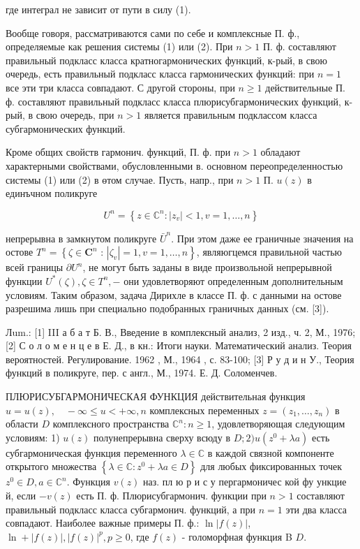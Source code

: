\documentclass[10pt]{article}
\begin{document}
где интеграл не зависит от пути в силу (1).



Вообще говоря, рассматриваются сами по себе и комплексные П. ф., определяемые как решения системы (1) или (2). При $n>1$ П. ф. составляют правильный подкласс класса кратногармонических функций, к-рый, в свою очередь, есть правильный подкласс класса гармонических функций: при $n=1$ все эти три класса совпадают. С другой стороны, при $n \geqslant 1$ действительные П. ф. составляют правильный подкласс класса плюрисубгармонических функций, к-рый, в свою очередь, при $n>1$ является правильным подклассом класса субгармонических функций.



Кроме общих свойств гармонич. функций, П. ф. при $n>1$ обладают характерными свойствами, обусловленными в. основном переопределенностью системы (1) или (2) в өтом случае. Пусть, напр., при $n>1$ П. $u(z)$ в единъчном поликруге



\[

U^{n}=\left\{z \in \mathbb{C}^{n}:\left|z_{v}\right|<1, v=1, \ldots, n\right\}

\]



непрерывна в замкнутом поликруге $\bar{U}^{n}$. При этом даже ее граничные значения на остове $T^{n}=\left\{\zeta \in \mathbf{C}^{n}\right.$ : $\left.\left|\zeta_{v}\right|=1, v=1, \ldots, n\right\}$, являюгцемся правильной частью всей границы $\partial U^{n}$, не могут быть заданы в виде произвольной непрерывной функции $U^{*}(\zeta), \zeta \in T^{n},-$ они удовлетворяют определенным дополнительным условиям. Таким образом, задача Дирихле в классе П. ф. с данными на остове разрешима лишь при специально подобранных граничных данных (см. [3]).



Лum.: [1] III а б а т Б. В., Введение в комплексный анализ, 2 изд., ч. 2, М., 1976; [2] С о л о м е н ц е в Е. Д., в кн.: Итоги науки. Математический анализ. Теория вероятностей. Регулирование. 1962 , М., 1964 , с. 83-100; [3] Р у д и н У., Теория функций в поликруге, пер. с англ., М., 1974. Е. Д. Соломенчев.



ПЛЮРИСУБГАРМОНИЧЕСКАЯ ФУНКЦИЯ действительная функция $u=u(z), \quad-\infty \leqslant u<+\infty, n$ комплексных переменных $z=\left(z_{1}, \ldots, z_{n}\right)$ в области $D$ комплексного пространства $\mathbb{C}^{n}: n \geqslant 1$, удовлетворяющая следующим условиям: 1) $u(z)$ полунепрерывна сверху всюду в $D ; 2) u\left(z^{0}+\lambda a\right)$ есть субгармоническая функция переменного $\lambda \in \mathbb{C}$ в каждой связной компоненте открытого множества $\left\{\lambda \in \mathbb{C}: z^{0}+\lambda a \in D\right\}$ для любых фиксированных точек $z^{0} \in D, a \in \mathbb{C}^{n}$. Функция $v(z)$ наз. пл ю р и с у пергармоничес кой фу ункцие й, если $-v(z)$ есть П. ф. Плюрисубгармонич. функции при $n>1$ составляют правильный подкласс класса субгармонич. функций, а при $n=1$ эти два класса совпадают. Наиболее важные примеры П. ф.: $\ln |f(z)|$, $\ln +|f(z)|,|f(z)|^{p}, p \geqslant 0$, где $f(z)$ - голоморфная функция B $D$.
\end{document}
